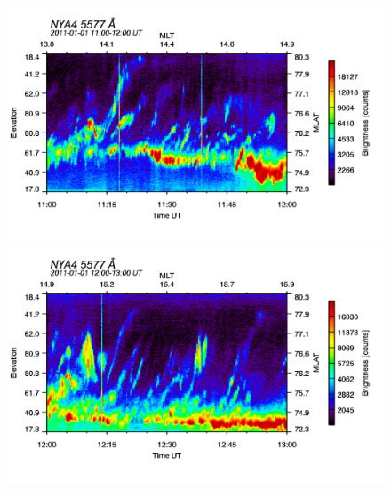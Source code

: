 \begin{figure}



\begin{minipage}{0.24\textwidth}
\includegraphics[width=\textwidth]{Figures/Allsky/5577/nya4_20110101_1100_1200_5577_cal.png}
\end{minipage}
\begin{minipage}{0.24\textwidth}
\includegraphics[width=\textwidth]{Figures/Allsky/5577/nya4_20110101_1200_1300_5577_cal.png}
\end{minipage}
\begin{minipage}{0.24\textwidth}

\end{minipage}
\end{figure}
